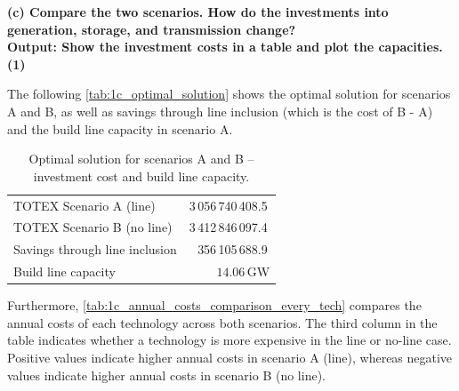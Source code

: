 \textbf{
    (c) Compare the two scenarios. How do the investments into generation, storage, and transmission change? \\
    Output: Show the investment costs in a table and plot the capacities.(1)
    }

The following \autoref{tab:1c_optimal_solution} shows the optimal solution for scenarios A and B, as well as savings through line inclusion (which is the cost of B - A) and the build line capacity in scenario A. 

\begin{table}[h]
    \centering
    \begin{tabular}{l r}
        \hline
        TOTEX Scenario A (line)         & 3\,056\,740\,408.5\,\text{€}  \\
        TOTEX Scenario B (no line)      & 3\,412\,846\,097.4\,\text{€}  \\
        Savings through line inclusion  & 356\,105\,688.9\,\text{€}     \\
        Build line capacity             & $14.06$\,GW                   \\
        \hline
    \end{tabular}
    \caption{Optimal solution for scenarios A and B – investment cost and build line capacity.}
    \label{tab:1c_optimal_solution}
\end{table}

Furthermore, \autoref{tab:1c_annual_costs_comparison_every_tech} compares the annual costs of each technology across both scenarios.
The third column in the table indicates whether a technology is more expensive in the line or no-line case.
Positive values indicate higher annual costs in scenario A (line), whereas negative values indicate higher annual costs in scenario B (no line). 

